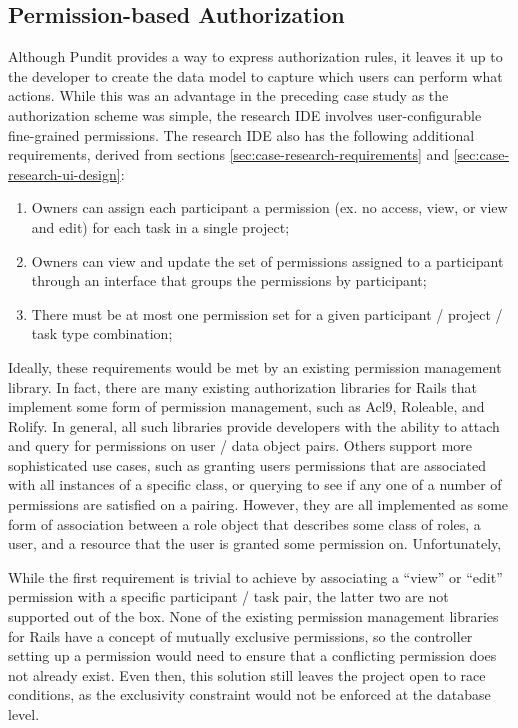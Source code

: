 \documentclass[document.tex]{subfiles}
\begin{document}
\FloatBarrier

\subsection {Permission-based Authorization}
\label{sec:case-research-permission-based-auth}

Although Pundit provides a way to express authorization rules, it leaves it up to the developer to create the data model to capture which users can perform what actions. While this was an advantage in the preceding case study as the authorization scheme was simple, the research IDE involves user-configurable fine-grained permissions. The research IDE also has the following additional requirements, derived from sections \ref{sec:case-research-requirements} and \ref{sec:case-research-ui-design}:
\begin{enumerate}
\item Owners can assign each participant a permission (ex. no access, view, or view and edit) for each task in a single project;
\item Owners can view and update the set of permissions assigned to a participant through an interface that groups the permissions by participant;
\item There must be at most one permission set for a given participant / project / task type combination;
\end{enumerate}

Ideally, these requirements would be met by an existing permission management library.
In fact, there are many existing authorization libraries for Rails that implement some form of permission management, such as Acl9, Roleable, and Rolify.
In general, all such libraries provide developers with the ability to attach and query for permissions on user / data object pairs.
Others support more sophisticated use cases, such as granting users permissions that are associated with all instances of a specific class, or querying to see if any one of a number of permissions are satisfied on a pairing.
However, they are all implemented as some form of association between a role object that describes some class of roles, a user, and a resource that the user is granted some permission on. Unfortunately, 

While the first requirement is trivial to achieve by associating a ``view'' or ``edit'' permission with a specific participant / task pair, the latter two are not supported out of the box.
None of the existing permission management libraries for Rails have a concept of
mutually exclusive permissions, so the controller setting up a permission would need to ensure that a conflicting permission does not already exist.
Even then, this solution still leaves the project open to race conditions, as the exclusivity constraint would not be enforced at the database level.
\end{document}
